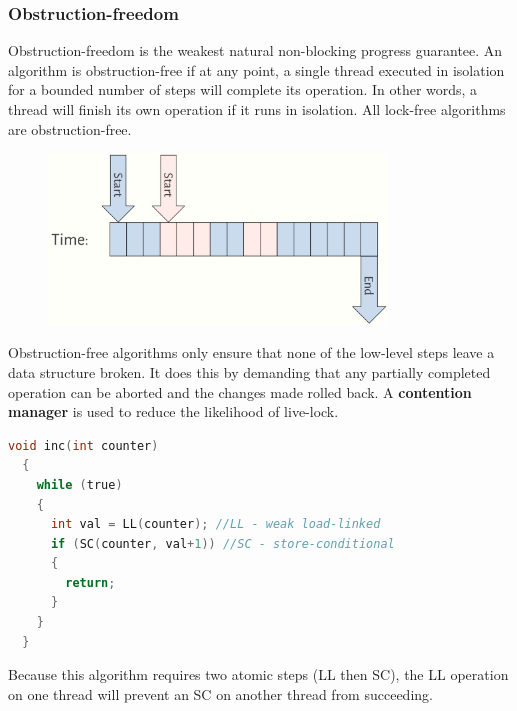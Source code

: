 \documentclass[CS4204-Notes.tex]{subfiles}
\begin{document}
\subsubsection{Obstruction-freedom}
Obstruction-freedom is the weakest natural non-blocking progress guarantee. An algorithm is obstruction-free if at any point, a single thread executed in isolation for a bounded number of steps will complete its operation. In other words, a thread will finish its own operation if it runs in isolation. All lock-free algorithms are obstruction-free.
\begin{figure}[H]
  \centering
  \includegraphics[width=0.8\textwidth, keepaspectratio]{imgs/obstruction-free.png}
\end{figure}
\noindent
Obstruction-free algorithms only ensure that none of the low-level steps leave a data structure broken. It does this by demanding that any partially completed operation can be aborted and the changes made rolled back. A \textbf{contention manager} is used to reduce the likelihood of live-lock.
\begin{lstlisting}[caption={Obstruction-free algorithm to increment a counter}, language=C]
  void inc(int counter)
  {
    while (true)
    {
      int val = LL(counter); //LL - weak load-linked
      if (SC(counter, val+1)) //SC - store-conditional
      {
        return;
      }
    }
  }

\end{lstlisting}
Because this algorithm requires two atomic steps (LL then SC), the LL operation on one thread will prevent an SC on another thread from succeeding.
\end{document}
